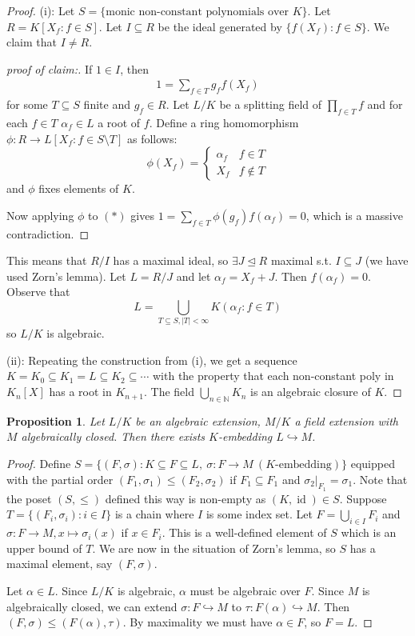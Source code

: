 \documentclass{article}
\theoremstyle{definition}
\theoremstyle{remark}
\theoremstyle{plain}
\newtheorem{prop}[defn]{Proposition}
\newcommand{\NN}{\mathbb{N}}
\begin{document}
\begin{proof}
    (i): Let $S=\{\text{monic non-constant polynomials over }K\}$. Let $R=K[X_f:f\in S]$. Let $I\subseteq R$ be the ideal generated by $\{f(X_f):f\in S\}$. We claim that $I\neq R$. 
    \begin{proof}[proof of claim:]
        If $1\in I$, then \begin{align*}1=\sum_{f\in T} g_ff(X_f)\tag{$\ast$}\end{align*} for some $T\subseteq S$ finite and $g_f\in R$. Let $L/K$ be a splitting field of $\prod_{f\in T} f$ and for each $f\in T$ $\alpha_f\in L$ a root of $f$. Define a ring homomorphism $\phi:R\to L[X_f:f\in S\setminus T]$ as follows:
        \[\phi(X_f)=\begin{cases}
            \alpha_f & f\in T\\ X_f & f\notin T
        \end{cases}\]
        and $\phi$ fixes elements of $K$.

        Now applying $\phi$ to $(\ast)$ gives $1=\sum_{f\in T}\phi(g_f)f(\alpha_f)=0$, which is a massive contradiction.
    \end{proof}
    This means that $R/I$ has a maximal ideal, so $\exists J\trianglelefteq R$ maximal s.t. $I\subseteq J$ (we have used Zorn's lemma). Let $L=R/J$ and let $\alpha_f=X_f+J$. Then $f(\alpha_f)=0$. Observe that
    \[L=\bigcup_{T\subseteq S, |T|<\infty}K(\alpha_f:f\in T)\]
    so $L/K$ is algebraic.

    (ii): Repeating the construction from (i), we get a sequence $K=K_0\subseteq K_1=L\subseteq K_2\subseteq \cdots$ with the property that each non-constant poly in $K_n[X]$ has a root in $K_{n+1}$. The field $\bigcup_{n\in\NN}K_n$ is an algebraic closure of $K$.
\end{proof}
\begin{prop}
    Let $L/K$ be an algebraic extension, $M/K$ a field extension with $M$ algebraically closed. Then there exists $K$-embedding $L\hookrightarrow M$.
\end{prop}
\begin{proof}
    Define $S=\{(F,\sigma):K\subseteq F\subseteq L,\ \sigma:F\to M\ (K\text{-embedding})\}$ equipped with the partial order $(F_1,\sigma_1)\le (F_2,\sigma_2)$ if $F_1\subseteq F_1$ and $\sigma_2|_{F_1}=\sigma_1$. Note that the poset $(S,\le )$ defined this way is non-empty as $(K,\operatorname{id})\in S$. Suppose $T=\{(F_i,\sigma_i):i\in I\}$ is a chain where $I$ is some index set. Let $F=\bigcup_{i\in I} F_i$ and $\sigma:F\to M, x\mapsto \sigma_i(x)$ if $x\in F_i$. This is a well-defined element of $S$ which is an upper bound of $T$. We are now in the situation of Zorn's lemma, so $S$ has a maximal element, say $(F,\sigma)$.

    Let $\alpha\in L$. Since $L/K$ is algebraic, $\alpha$ must be algebraic over $F$. Since $M$ is algebraically closed, we can extend $\sigma:F\hookrightarrow M$ to $\tau:F(\alpha)\hookrightarrow M$. Then $(F,\sigma)\le (F(\alpha),\tau)$. By maximality we must have $\alpha\in F$, so $F=L$.
\end{proof}
\end{document}
